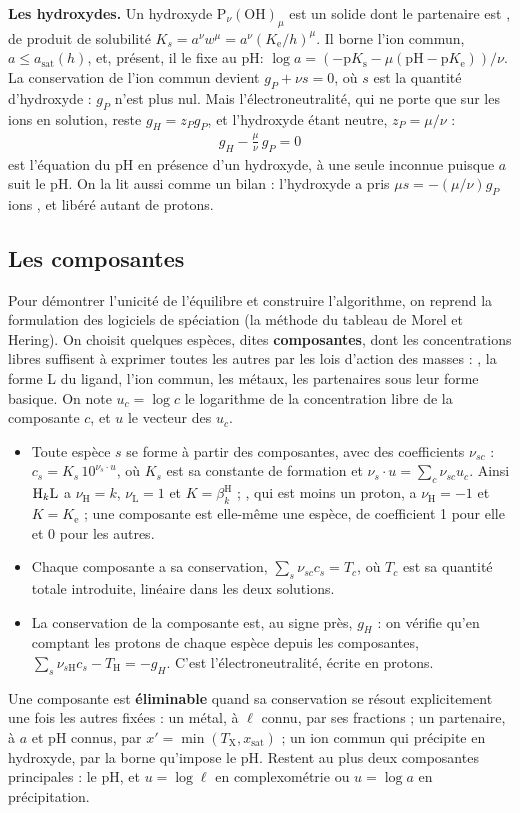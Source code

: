 \documentclass[a4paper,11pt]{article}
\newcommand\gras[1]{\textbf{#1}}
\newcommand\pH{\ensuremath{\mathrm{pH}}\xspace}
\newcommand\pKs{\ensuremath{\mathrm{p}K_\mathrm{s}}\xspace}
\newcommand\pKe{\ensuremath{\mathrm{p}K_\mathrm{e}}\xspace}
\newcommand\Ke{\ensuremath{K_\mathrm{e}}\xspace}
\newcommand\pare[1]{\left(#1\right)}
\newcommand\bH{\beta^{\mathrm H}}
\begin{document}
\gras{Les hydroxydes.} Un hydroxyde $\mathrm P_\nu(\mathrm{OH})_\mu$ est un solide dont le partenaire est , de produit de solubilité $K_s=a^\nu w^\mu=a^\nu(\Ke/h)^\mu$.
Il borne l'ion commun, $a\le a_\text{sat}(h)$, et, présent, il le fixe au \pH : $\log a=\pare{-\pKs-\mu(\pH-\pKe)}/\nu$.
La conservation de l'ion commun devient $g_P+\nu s=0$, où $s$ est la quantité d'hydroxyde : $g_P$ n'est plus nul.
Mais l'électroneutralité, qui ne porte que sur les ions en solution, reste $g_H=z_Pg_P$, et l'hydroxyde étant neutre, $z_P=\mu/\nu$ :
\begin{align}
g_H-\frac\mu\nu\,g_P=0
\end{align}
est l'équation du \pH en présence d'un hydroxyde, à une seule inconnue puisque $a$ suit le \pH.
On la lit aussi comme un bilan : l'hydroxyde a pris $\mu s=-(\mu/\nu)g_P$ ions , et libéré autant de protons.

\subsection{Les composantes}
Pour démontrer l'unicité de l'équilibre et construire l'algorithme, on reprend la formulation des logiciels de spéciation (la méthode du tableau de Morel et Hering).
On choisit quelques espèces, dites \gras{composantes}, dont les concentrations libres suffisent à exprimer toutes les autres par les lois d'action des masses : , la forme L du ligand, l'ion commun, les métaux, les partenaires sous leur forme basique.
On note $u_c=\log c$ le logarithme de la concentration libre de la composante $c$, et $u$ le vecteur des $u_c$.
\begin{itemize}
\item Toute espèce $s$ se forme à partir des composantes, avec des coefficients $\nu_{sc}$ : $c_s=K_s\,10^{\nu_s\cdot u}$, où $K_s$ est sa constante de formation et $\nu_s\cdot u=\sum_c\nu_{sc}u_c$.
Ainsi $\ce{H}_k\mathrm L$ a $\nu_\mathrm H=k$, $\nu_\mathrm L=1$ et $K=\bH_k$ ; , qui est  moins un proton, a $\nu_\mathrm H=-1$ et $K=\Ke$ ; une composante est elle-même une espèce, de coefficient 1 pour elle et 0 pour les autres.
\item Chaque composante a sa conservation, $\sum_s\nu_{sc}c_s=T_c$, où $T_c$ est sa quantité totale introduite, linéaire dans les deux solutions.
\item La conservation de la composante  est, au signe près, $g_H$ : on vérifie qu'en comptant les protons de chaque espèce depuis les composantes, $\sum_s\nu_{s\mathrm H}c_s-T_\mathrm H=-g_H$.
C'est l'électroneutralité, écrite en protons.
\end{itemize}
Une composante est \gras{éliminable} quand sa conservation se résout explicitement une fois les autres fixées : un métal, à $\ell$ connu, par ses fractions ; un partenaire, à $a$ et \pH connus, par $x'=\min\pare{T_\mathrm X,x_\text{sat}}$ ; un ion commun qui précipite en hydroxyde, par la borne qu'impose le \pH.
Restent au plus deux composantes principales : le \pH, et $u=\log\ell$ en complexométrie ou $u=\log a$ en précipitation.
\end{document}
